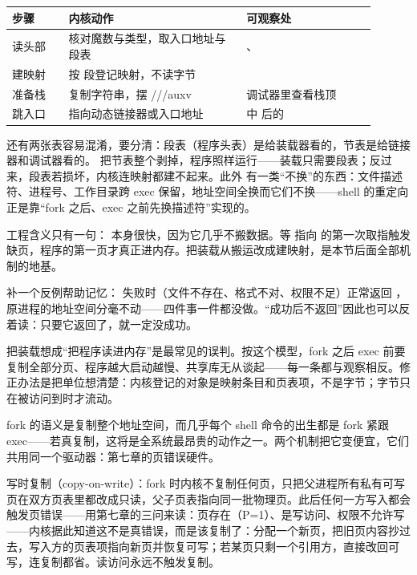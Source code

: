 \begin{longtable}{L{0.14\linewidth}L{0.44\linewidth}L{0.32\linewidth}}
\toprule
步骤 & 内核动作 & 可观察处 \\
\midrule
读头部 & 核对魔数与类型，取入口地址与段表 & 、 \\
建映射 & 按  段登记映射，不读字节 &  \\
准备栈 & 复制字符串，摆 ///auxv & 调试器里查看栈顶 \\
跳入口 &  指向动态链接器或入口地址 &  中  后的  \\
\bottomrule
\end{longtable}

还有两张表容易混淆，要分清：段表（程序头表）是给装载器看的，节表是给链接器和调试器看的。 把节表整个剥掉，程序照样运行——装载只需要段表；反过来，段表若损坏，内核连映射都建不起来。此外  有一类“不换”的东西：文件描述符、进程号、工作目录跨 exec 保留，地址空间全换而它们不换——shell 的重定向正是靠“fork 之后、exec 之前先换描述符”实现的。

工程含义只有一句： 本身很快，因为它几乎不搬数据。等  指向  的第一次取指触发缺页，程序的第一页才真正进内存。把装载从搬运改成建映射，是本节后面全部机制的地基。

补一个反例帮助记忆： 失败时（文件不存在、格式不对、权限不足）正常返回 ，原进程的地址空间分毫不动——四件事一件都没做。“成功后不返回”因此也可以反着读：只要它返回了，就一定没成功。

\begin{warningbox}
把装载想成“把程序读进内存”是最常见的误判。按这个模型，fork 之后 exec 前要复制全部分页、程序越大启动越慢、共享库无从谈起——每一条都与观察相反。修正办法是把单位想清楚：内核登记的对象是映射条目和页表项，不是字节；字节只在被访问到时才流动。
\end{warningbox}

fork 的语义是复制整个地址空间，而几乎每个 shell 命令的出生都是 fork 紧跟 exec——若真复制，这将是全系统最昂贵的动作之一。两个机制把它变便宜，它们共用同一个驱动器：第七章的页错误硬件。

写时复制（copy-on-write）：fork 时内核不复制任何页，只把父进程所有私有可写页在双方页表里都改成只读，父子页表指向同一批物理页。此后任何一方写入都会触发页错误——用第七章的三问来读：页存在（P=1）、是写访问、权限不允许写——内核据此知道这不是真错误，而是该复制了：分配一个新页，把旧页内容抄过去，写入方的页表项指向新页并恢复可写；若某页只剩一个引用方，直接改回可写，连复制都省。读访问永远不触发复制。


